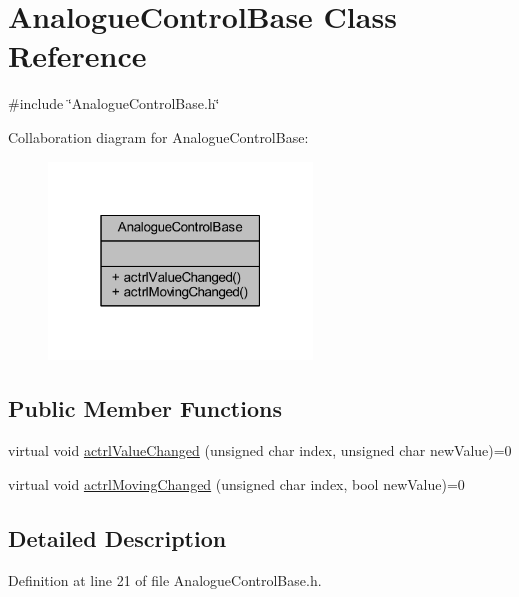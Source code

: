 \hypertarget{class_analogue_control_base}{}\section{Analogue\+Control\+Base Class Reference}
\label{class_analogue_control_base}


{\ttfamily \#include \char`\"{}Analogue\+Control\+Base.\+h\char`\"{}}



Collaboration diagram for Analogue\+Control\+Base\+:
\nopagebreak
\begin{figure}[H]
\begin{center}
\leavevmode
\includegraphics[width=199pt]{da/d66/class_analogue_control_base__coll__graph}
\end{center}
\end{figure}
\subsection*{Public Member Functions}
\begin{DoxyCompactItemize}
\item 
virtual void \hyperlink{class_analogue_control_base_a9d18c3e299a69c909a3ad88b70524c5d}{actrl\+Value\+Changed} (unsigned char index, unsigned char new\+Value)=0
\item 
virtual void \hyperlink{class_analogue_control_base_ab680f6fd45ec093200d3d78744957c1b}{actrl\+Moving\+Changed} (unsigned char index, bool new\+Value)=0
\end{DoxyCompactItemize}


\subsection{Detailed Description}


Definition at line 21 of file Analogue\+Control\+Base.\+h.



